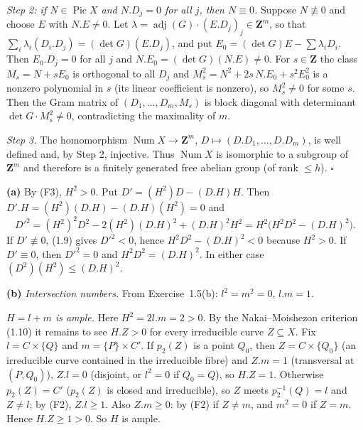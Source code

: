 \documentclass[11pt]{article}
\begin{document}
\emph{Step 2: if $N\in\operatorname{Pic}X$ and $N.D_j=0$ for all $j$, then $N\equiv0$.} Suppose $N\not\equiv0$ and choose $E$ with $N.E\ne0$. Let $\lambda=\operatorname{adj}(G)\cdot(E.D_j)_j\in\mathbf Z^m$, so that $\sum_i\lambda_i(D_i.D_j)=(\det G)(E.D_j)$, and put $E_0=(\det G)E-\sum\lambda_iD_i$. Then $E_0.D_j=0$ for all $j$ and $N.E_0=(\det G)(N.E)\ne0$. For $s\in\mathbf Z$ the class $M_s=N+sE_0$ is orthogonal to all $D_j$ and $M_s^2=N^2+2s\,N.E_0+s^2E_0^2$ is a nonzero polynomial in $s$ (its linear coefficient is nonzero), so $M_s^2\ne0$ for some $s$. Then the Gram matrix of $(D_1,\dots,D_m,M_s)$ is block diagonal with determinant $\det G\cdot M_s^2\ne0$, contradicting the maximality of $m$.

\emph{Step 3.} The homomorphism $\operatorname{Num}X\to\mathbf Z^m$, $D\mapsto(D.D_1,\dots,D.D_m)$, is well defined and, by Step 2, injective. Thus $\operatorname{Num}X$ is isomorphic to a subgroup of $\mathbf Z^m$ and therefore is a finitely generated free abelian group (of rank $\le h$). \hfill$\square$

\pf
\textbf{(a)} By (F3), $H^2>0$. Put $D'=(H^2)D-(D.H)H$. Then $D'.H=(H^2)(D.H)-(D.H)(H^2)=0$ and
\[ D'^2=(H^2)^2D^2-2(H^2)(D.H)^2+(D.H)^2H^2=H^2\bigl(H^2D^2-(D.H)^2\bigr). \]
If $D'\not\equiv0$, (1.9) gives $D'^2<0$, hence $H^2D^2-(D.H)^2<0$ because $H^2>0$. If $D'\equiv0$, then $D'^2=0$ and $H^2D^2=(D.H)^2$. In either case $(D^2)(H^2)\le(D.H)^2$.

\textbf{(b)} \emph{Intersection numbers.} From Exercise~1.5(b): $l^2=m^2=0$, $l.m=1$.

\emph{$H=l+m$ is ample.} Here $H^2=2l.m=2>0$. By the Nakai--Moishezon criterion (1.10) it remains to see $H.Z>0$ for every irreducible curve $Z\subseteq X$. Fix $l=C\times\{Q\}$ and $m=\{P\}\times C'$. If $p_2(Z)$ is a point $Q_0$, then $Z=C\times\{Q_0\}$ (an irreducible curve contained in the irreducible fibre) and $Z.m=1$ (transversal at $(P,Q_0)$), $Z.l=0$ (disjoint, or $l^2=0$ if $Q_0=Q$), so $H.Z=1$. Otherwise $p_2(Z)=C'$ ($p_2(Z)$ is closed and irreducible), so $Z$ meets $p_2^{-1}(Q)=l$ and $Z\neq l$; by (F2), $Z.l\ge1$. Also $Z.m\ge0$: by (F2) if $Z\neq m$, and $m^2=0$ if $Z=m$. Hence $H.Z\ge1>0$. So $H$ is ample.
\end{document}
